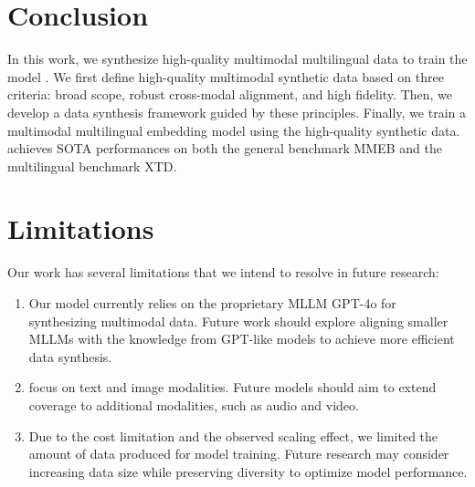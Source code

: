 \section{Conclusion}
In this work, we synthesize high-quality multimodal multilingual data to train the model \ours{}.
We first define high-quality multimodal synthetic data based on three criteria: broad scope, robust cross-modal alignment, and high fidelity.
Then, we develop a data synthesis framework guided by these principles.
Finally, we train a multimodal multilingual embedding model using the high-quality synthetic data.
\ours{} achieves SOTA performances on both the general benchmark MMEB and the multilingual benchmark XTD.


\section*{Limitations}

Our work has several limitations that we intend to resolve in future research:

\begin{enumerate}
    \item Our model currently relies on the proprietary MLLM GPT-4o for synthesizing multimodal data. Future work should explore aligning smaller MLLMs with the knowledge from GPT-like models to achieve more efficient data synthesis.
    \item \ours{} focus on text and image modalities. Future models should aim to extend coverage to additional modalities, such as audio and video.
    \item Due to the cost limitation and the observed scaling effect, we limited the amount of data produced for model training. Future research may consider increasing data size while preserving diversity to optimize model performance.
\end{enumerate}



